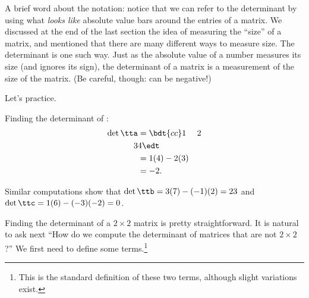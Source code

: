 A brief word about the notation: notice that we can refer to the determinant by using what \textit{looks like} absolute value bars around the entries of a matrix. We discussed at the end of the last section the idea of measuring the ``size'' of a matrix, and mentioned that there are many different ways to measure size. The determinant is one such way. Just as the absolute value of a number measures its size (and ignores its sign), the determinant of a matrix is a measurement of the size of the matrix. (Be careful, though: \det{\tta} can be negative!)

Let's practice.

\medskip

{Finding the determinant of \tta:
\begin{align*}
\det{\tta} &= \bdt{cc}1&2\\3&4\edt \\
						&= 1(4) - 2(3)\\
						&= -2.
\end{align*}

Similar computations show that $\det{\ttb} = 3(7)- (-1)(2) = 23$ and $\det{\ttc} = 1(6) - (-3)(-2) = 0$.}

\medskip

Finding the determinant of a $2\times2$ matrix is pretty straightforward. It is natural to ask next ``How do we compute the determinant of matrices that are not $2\times2$?'' We first need to define some terms.\footnote{This is the standard definition of these two terms, although slight variations exist.}

\smallskip


